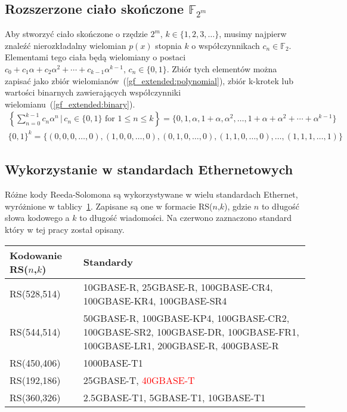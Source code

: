 \subsection{Rozszerzone ciało skończone $\mathbb{F}_{2^m}$}

Aby stworzyć ciało skończone o rzędzie $2^m$, $k \in \{ 1, 2, 3, \ldots \}$, musimy
najpierw znaleźć nierozkładalny wielomian $p(x)$ stopnia $k$ o współczynnikach
$c_{n} \in \mathbb{F}_{2}$.
Elementami tego ciała będą wielomiany o postaci $c_{0} + c_{1}\alpha + c_{2}\alpha^{2} +
    \cdots + c_{k-1}\alpha^{k-1}$, $c_{n} \in \{0, 1\}$.
Zbiór tych elementów można zapisać jako zbiór wielomianów~(\ref{gf_extended:polynomial}),
zbiór k-krotek lub wartości binarnych zawierających współczynniki
wielomianu~(\ref{gf_extended:binary}).
\begin{align}
    \left\{ \sum_{n=0}^{k-1} c_{n}\alpha^{n} \,|\, c_{n} \in \{0,1\} \text{ for } 1 \le n \le k \right\}
        = \{ 0, 1, \alpha, 1 + \alpha, \alpha^{2}, \ldots, 1 + \alpha + \alpha^2 + \cdots + \alpha^{k-1} \}
        \label{gf_extended:polynomial} \\
    \{ 0, 1 \}^{k} = \{ (0, 0, 0, \ldots, 0), (1, 0, 0, \ldots, 0), (0, 1, 0, \ldots, 0),
    (1, 1, 0, \ldots, 0), \ldots, (1, 1, 1, \ldots, 1) \} \label{gf_extended:binary}
\end{align}

\subsection{Wykorzystanie w standardach Ethernetowych}

Różne kody Reeda-Solomona są wykorzystywane w wielu standardach Ethernet,
wyróżnione w tablicy~\ref{standards:title}. Zapisane są one w formacie RS($n$,$k$),
gdzie $n$ to długość słowa kodowego a $k$ to długość wiadomości.
Na czerwono zaznaczono standard który w tej pracy został opisany.

\begingroup
{}
\begin{table}[h]
\label{standards:title}
\centering
    \begin{tabular}{m{3cm} m{9cm}}
    \toprule
    Kodowanie RS($n$,$k$)    & Standardy \\
    \midrule
    RS(528,514)     & 10GBASE-R, 25GBASE-R, 100GBASE-CR4, 100GBASE-KR4, 100GBASE-SR4 \\
    \midrule
    RS(544,514)     & 50GBASE-R, \;\; 100GBASE-KP4, 100GBASE-CR2, 100GBASE-SR2,
    \; 100GBASE-DR, 100GBASE-FR1, 100GBASE-LR1, \hfill \; 200GBASE-R, \hfill 400GBASE-R \\
    \midrule
    RS(450,406)     & 1000BASE-T1 \\
    \midrule
    RS(192,186)     & 25GBASE-T, \;\;\;\;\;\;\;\;\;\;\;\;\; \textcolor{red}{40GBASE-T} \\
    \midrule
    RS(360,326)     & 2.5GBASE-T1, \hfill 5GBASE-T1, \hfill 10GBASE-T1 \\
    \bottomrule
    \end{tabular}
\end{table}
\endgroup


